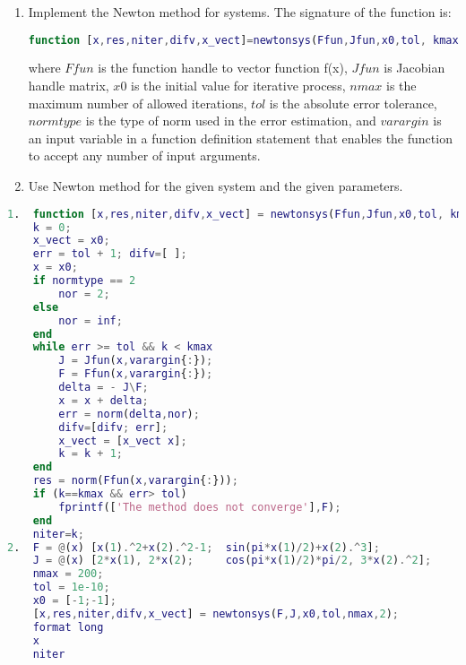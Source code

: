 \documentclass[12pt, a4paper]{report}
\newtheorem[style=M,bodystyle=\normalfont]{theorem}{Theorem}
\newtheorem[style=M,bodystyle=\normalfont]{corollary}{Corollary}
\newtheorem[style=M,bodystyle=\normalfont]{lemma}{Lemma}
\newtheorem[style=M,bodystyle=\normalfont]{definition}{Definition}
\begin{document}
    \newpage

    \begin{Exercise}[label=9]
        \begin{enumerate}
            \item Implement the Newton method for systems. The signature of the function is:
                \begin{lstlisting}[language=Matlab]
function [x,res,niter,difv,x_vect]=newtonsys(Ffun,Jfun,x0,tol, kmax,normtype,varargin)
                \end{lstlisting}  
                where $Ffun$ is the function handle to vector function f(x), $Jfun$ is Jacobian handle matrix, $x0$ is the initial value for iterative process, $nmax$ is the 
                maximum number of allowed iterations, $tol$ is the absolute error tolerance, $normtype$ is the type of norm used in the error estimation, and $varargin$ is an input 
                variable in a function definition statement that enables the function to accept any number of input arguments. 
            \item Use Newton method for the given system and the given parameters. 
        \end{enumerate}
        
    \end{Exercise}
    \begin{Answer}[ref=9]
        \begin{lstlisting}[language=Matlab]
1.  function [x,res,niter,difv,x_vect] = newtonsys(Ffun,Jfun,x0,tol, kmax,normtype,varargin)
    k = 0;
    x_vect = x0;
    err = tol + 1; difv=[ ];
    x = x0;
    if normtype == 2
        nor = 2;
    else
        nor = inf;
    end
    while err >= tol && k < kmax
        J = Jfun(x,varargin{:});
        F = Ffun(x,varargin{:});
        delta = - J\F;
        x = x + delta;
        err = norm(delta,nor); 
        difv=[difv; err];
        x_vect = [x_vect x];
        k = k + 1;
    end
    res = norm(Ffun(x,varargin{:}));
    if (k==kmax && err> tol)
        fprintf(['The method does not converge'],F);
    end
    niter=k;          
2.  F = @(x) [x(1).^2+x(2).^2-1;  sin(pi*x(1)/2)+x(2).^3];
    J = @(x) [2*x(1), 2*x(2);     cos(pi*x(1)/2)*pi/2, 3*x(2).^2];
    nmax = 200;
    tol = 1e-10;
    x0 = [-1;-1];
    [x,res,niter,difv,x_vect] = newtonsys(F,J,x0,tol,nmax,2);
    format long                       
    x
    niter
        \end{lstlisting}  
    \end{Answer}
\end{document}
